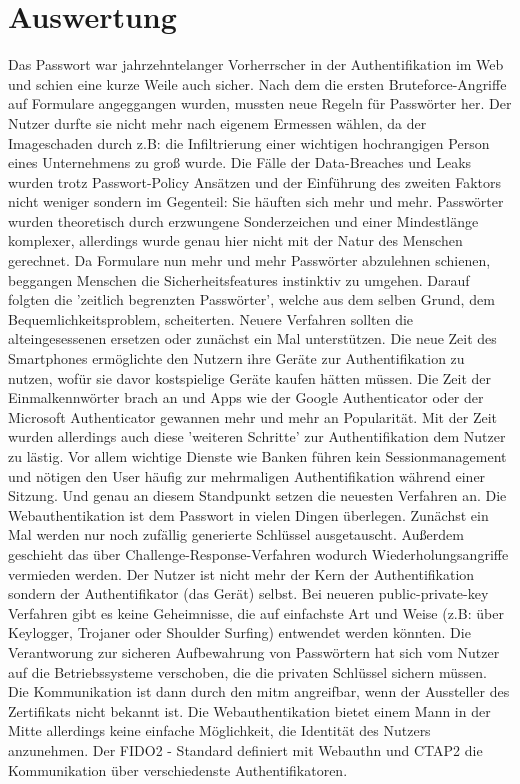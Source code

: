 \chapter{Auswertung}
Das Passwort war jahrzehntelanger Vorherrscher in der Authentifikation im Web und schien eine kurze Weile auch sicher. Nach dem die ersten Bruteforce-Angriffe auf Formulare angeggangen wurden, mussten neue Regeln für Passwörter her. Der Nutzer durfte sie nicht mehr nach eigenem Ermessen wählen, da der Imageschaden durch z.B: die Infiltrierung einer wichtigen hochrangigen Person eines Unternehmens zu groß wurde. Die Fälle der Data-Breaches und Leaks wurden trotz Passwort-Policy Ansätzen und der Einführung des zweiten Faktors nicht weniger sondern im Gegenteil: Sie häuften sich mehr und mehr. Passwörter wurden theoretisch durch erzwungene Sonderzeichen und einer Mindestlänge komplexer, allerdings wurde genau hier nicht mit der Natur des Menschen gerechnet. Da Formulare nun mehr und mehr Passwörter abzulehnen schienen, beggangen Menschen die Sicherheitsfeatures instinktiv zu umgehen. Darauf folgten die 'zeitlich begrenzten Passwörter', welche aus dem selben Grund, dem Bequemlichkeitsproblem, scheiterten. Neuere Verfahren sollten die alteingesessenen ersetzen oder zunächst ein Mal unterstützen. Die neue Zeit des Smartphones ermöglichte den Nutzern ihre Geräte zur Authentifikation zu nutzen, wofür sie davor kostspielige Geräte kaufen hätten müssen. Die Zeit der Einmalkennwörter brach an und Apps wie der Google Authenticator oder der Microsoft Authenticator gewannen mehr und mehr an Popularität. Mit der Zeit wurden allerdings auch diese 'weiteren Schritte' zur Authentifikation dem Nutzer zu lästig. Vor allem wichtige Dienste wie Banken führen kein Sessionmanagement und nötigen den User häufig zur mehrmaligen Authentifikation während einer Sitzung. Und genau an diesem Standpunkt setzen die neuesten Verfahren an. Die Webauthentikation ist dem Passwort in vielen Dingen überlegen. Zunächst ein Mal werden nur noch zufällig generierte Schlüssel ausgetauscht. Außerdem geschieht das über Challenge-Response-Verfahren wodurch Wiederholungsangriffe vermieden werden. Der Nutzer ist nicht mehr der Kern der Authentifikation sondern der Authentifikator (das Gerät) selbst. Bei neueren public-private-key Verfahren gibt es keine Geheimnisse, die auf einfachste Art und Weise (z.B: über Keylogger, Trojaner oder Shoulder Surfing) entwendet werden könnten. Die Verantworung zur sicheren Aufbewahrung von Passwörtern hat sich vom Nutzer auf die Betriebssysteme verschoben, die die privaten Schlüssel sichern müssen. Die Kommunikation ist dann durch den \ac{mitm} angreifbar, wenn der Aussteller des Zertifikats nicht bekannt ist. Die Webauthentikation bietet einem Mann in der Mitte allerdings keine einfache Möglichkeit, die Identität des Nutzers anzunehmen. Der FIDO2 - Standard definiert mit Webauthn und CTAP2 die Kommunikation über verschiedenste Authentifikatoren.
\newpage

